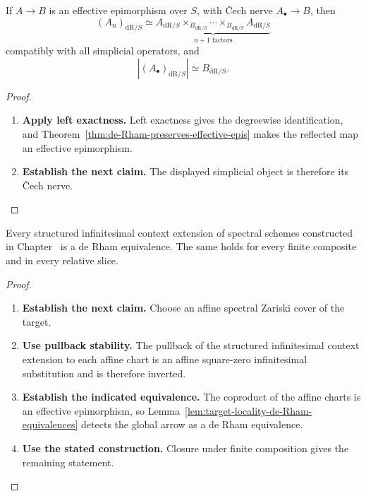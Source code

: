 \begin{corollary}
\label{cor:de-Rham-cech-continuity}
If \(A\to B\) is an effective epimorphism over \(S\), with \v{C}ech nerve
\(A_\bullet\to B\), then
\[
  (A_n)_{\mathrm{dR}/S}
  \simeq
  \underbrace{
  A_{\mathrm{dR}/S}\times_{B_{\mathrm{dR}/S}}\cdots
  \times_{B_{\mathrm{dR}/S}}A_{\mathrm{dR}/S}
  }_{n+1\text{ factors}}
\]
compatibly with all simplicial operators, and
\[
  |(A_\bullet)_{\mathrm{dR}/S}|
  \simeq
  B_{\mathrm{dR}/S}.
\]
\end{corollary}

\begin{proof}
\leavevmode
\begin{enumerate}[label=\textup{(\arabic*)}]
    \item \textbf{Apply left exactness.}
    Left exactness gives the degreewise identification, and
    Theorem~\ref{thm:de-Rham-preserves-effective-epis} makes the reflected map an effective
    epimorphism.
    \item \textbf{Establish the next claim.}
    The displayed simplicial object is therefore its \v{C}ech nerve.
\end{enumerate}
\end{proof}

\begin{proposition}
\label{prop:global-square-zero-de-Rham}
Every structured infinitesimal context extension of spectral schemes constructed in
Chapter~ is a de Rham equivalence.
The same holds for every finite composite and in every relative slice.
\end{proposition}

\begin{proof}
\leavevmode
\begin{enumerate}[label=\textup{(\arabic*)}]
    \item \textbf{Establish the next claim.}
    Choose an affine spectral Zariski cover of the target.
    \item \textbf{Use pullback stability.}
    The pullback of the
    structured infinitesimal context extension to each affine chart is an affine square-zero
    infinitesimal substitution and is therefore inverted.
    \item \textbf{Establish the indicated equivalence.}
    The coproduct of the
    affine charts is an effective epimorphism, so
    Lemma~\ref{lem:target-locality-de-Rham-equivalences} detects the global arrow as
    a de Rham equivalence.
    \item \textbf{Use the stated construction.}
    Closure under finite composition gives the remaining
    statement.
\end{enumerate}
\end{proof}

